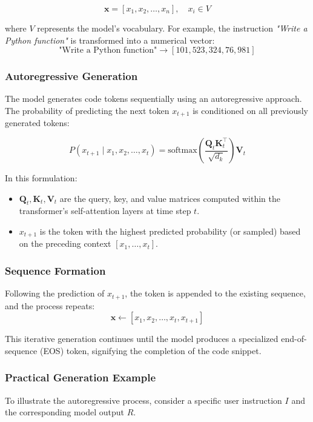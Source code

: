 \begin{equation}
\mathbf{x} = [x_1, x_2, \dots, x_n], \quad x_i \in V
\end{equation}

where $V$ represents the model's vocabulary. For example, the instruction \textit{"Write a Python function"} is transformed into a numerical vector:
\begin{equation}
\text{"Write a Python function"} \longrightarrow [101, 523, 324, 76, 981]
\end{equation}

\subsubsection{Autoregressive Generation}
The model generates code tokens sequentially using an autoregressive approach. The probability of predicting the next token $x_{t+1}$ is conditioned on all previously generated tokens:



\begin{equation}
P(x_{t+1} \mid x_1, x_2, \dots, x_t) = \text{softmax}\left(\frac{\mathbf{Q}_t \mathbf{K}_t^\top}{\sqrt{d_k}} \right) \mathbf{V}_t
\end{equation}

In this formulation:
\begin{itemize}
    \item $\mathbf{Q}_t, \mathbf{K}_t, \mathbf{V}_t$ are the query, key, and value matrices computed within the transformer's self-attention layers at time step $t$.
    \item $x_{t+1}$ is the token with the highest predicted probability (or sampled) based on the preceding context $[x_1, \dots, x_t]$.
\end{itemize}

\subsubsection{Sequence Formation}
Following the prediction of $x_{t+1}$, the token is appended to the existing sequence, and the process repeats:
\begin{equation}
\mathbf{x} \leftarrow [x_1, x_2, \dots, x_t, x_{t+1}]
\end{equation}

This iterative generation continues until the model produces a specialized end-of-sequence (EOS) token, signifying the completion of the code snippet.

\subsubsection{Practical Generation Example}
To illustrate the autoregressive process, consider a specific user instruction $I$ and the corresponding model output $R$.

